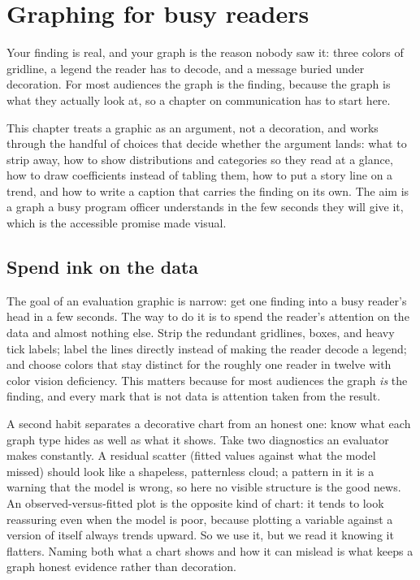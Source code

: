 \documentclass[
    a4paper,
    fontsize=10pt,
    twoside=true,
    numbers=noenddot,
]{kaobook}
\begin{document}

\chapter{Graphing for busy readers}\label{ch:graphs}

Your finding is real, and your graph is the reason nobody saw it: three colors of gridline, a legend the reader has to decode, and a message buried under decoration. For most audiences the graph is the finding, because the graph is what they actually look at, so a chapter on communication has to start here.

This chapter treats a graphic as an argument, not a decoration, and works through the handful of choices that decide whether the argument lands: what to strip away, how to show distributions and categories so they read at a glance, how to draw coefficients instead of tabling them, how to put a story line on a trend, and how to write a caption that carries the finding on its own. The aim is a graph a busy program officer understands in the few seconds they will give it, which is the accessible promise made visual.

\section{Spend ink on the data}
The goal of an evaluation graphic is narrow: get one finding into a busy reader's head in a few seconds. The way to do it is to spend the reader's attention on the data and almost nothing else. Strip the redundant gridlines, boxes, and heavy tick labels; label the lines directly instead of making the reader decode a legend; and choose colors that stay distinct for the roughly one reader in twelve with color vision deficiency. This matters because for most audiences the graph \emph{is} the finding, and every mark that is not data is attention taken from the result.

A second habit separates a decorative chart from an honest one: know what each graph type hides as well as what it shows. Take two diagnostics an evaluator makes constantly. A residual scatter (fitted values against what the model missed) should look like a shapeless, patternless cloud; a pattern in it is a warning that the model is wrong, so here no visible structure is the good news. An observed-versus-fitted plot is the opposite kind of chart: it tends to look reassuring even when the model is poor, because plotting a variable against a version of itself always trends upward. So we use it, but we read it knowing it flatters. Naming both what a chart shows and how it can mislead is what keeps a graph honest evidence rather than decoration.
\end{document}
